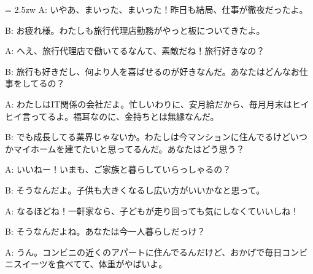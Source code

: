 \documentclass[11pt]{amsart}
\title{}
\author{}
\newenvironment{hangall}[1]{\hangindent = 2.5zw\everypar{\hangindent = 2.5zw}}{}
\begin{document}
\maketitle
\begin{hangall}{}%
A: いやあ、まいった、まいった！昨日も結局、仕事が徹夜だったよ。

B: お疲れ様。わたしも旅行代理店勤務がやっと板についてきたよ。

A: へえ、旅行代理店で働いてるなんて、素敵だね！旅行好きなの？

B: 旅行も好きだし、何より人を喜ばせるのが好きなんだ。あなたはどんなお仕事をしてるの？

A: わたしはIT関係の会社だよ。忙しいわりに、安月給だから、毎月月末はヒイヒイ言ってるよ。福耳なのに、金持ちとは無縁なんだ。

B: でも成長してる業界じゃないか。わたしは今マンションに住んでるけどいつかマイホームを建てたいと思ってるんだ。あなたはどう思う？

A: いいねー！いまも、ご家族と暮らしていらっしゃるの？

B: そうなんだよ。子供も大きくなるし広い方がいいかなと思って。

A: なるほどね！一軒家なら、子どもが走り回っても気にしなくていいしね！

B: そうなんだよね。あなたは今一人暮らしだっけ？

A: うん。コンビニの近くのアパートに住んでるんだけど、おかげで毎日コンビニスイーツを食べてて、体重がやばいよ。
\end{hangall}
\end{document}

